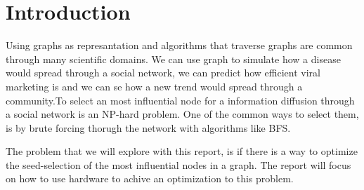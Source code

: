\chapter{Introduction} 
Using graphs as represantation and algorithms that traverse graphs are common through many scientific domains\cite{HybridFPGACPU}. We can use graph to simulate how a disease would spread through a social network, we can predict how efficient viral marketing is and we can se how a new trend would spread through a community\cite{MaxSpread}.To select an most influential node for a information diffusion through a social network is an NP-hard problem\cite{MaxSpread}. One of the common ways to select them, is by brute forcing thorugh the network with algorithms like BFS. 

The problem that we will explore with this report, is if there is a way to optimize the seed-selection of the most influential nodes in a graph. The report will focus on how to use hardware to achive an optimization to this problem.